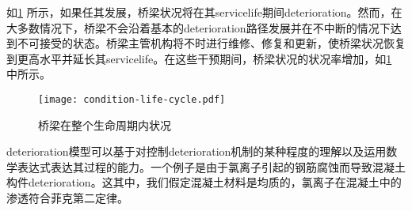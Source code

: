 如\cref{fig:condition-life-cycle} 所示，如果任其发展，桥梁状况将在其\gls*{servicelife}期间\gls*{deterioration}。然而，在大多数情况下，桥梁不会沿着基本的\gls*{deterioration}路径发展并在不中断的情况下达到不可接受的状态。桥梁主管机构将不时进行维修、修复和更新，使桥梁状况恢复到更高水平并延长其\gls*{servicelife}。在这些干预期间，桥梁状况的状况率增加，如\cref{fig:condition-life-cycle} 中所示。

\begin{figure}
  \texttt{[image: condition-life-cycle.pdf]}
  \caption{桥梁在整个生命周期内状况}\label{fig:condition-life-cycle}
\end{figure}


\gls*{deterioration}模型可以基于对控制\gls*{deterioration}机制的某种程度的理解以及运用数学表达式表达其过程的能力。一个例子是由于氯离子引起的钢筋腐蚀而导致混凝土构件\gls*{deterioration}。这其中，我们假定混凝土材料是均质的，氯离子在混凝土中的渗透符合菲克第二定律。


